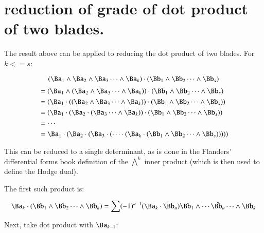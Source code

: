 \section{reduction of grade of dot product of two blades. }

The result above can be applied to reducing the dot product of two blades.  For $k<=s$:

\[
(\Ba_1 \wedge \Ba_2 \wedge \Ba_3 \cdots \wedge \Ba_k) \cdot (\Bb_1 \wedge \Bb_2 \cdots \wedge \Bb_s)
\]
\begin{align*}
&= (\Ba_1 \wedge (\Ba_2 \wedge \Ba_3 \cdots \wedge \Ba_k)) \cdot (\Bb_1 \wedge \Bb_2 \cdots \wedge \Bb_s) \\
&= (\Ba_1 \cdot ((\Ba_2 \wedge \Ba_3 \cdots \wedge \Ba_k)) \cdot (\Bb_1 \wedge \Bb_2 \cdots \wedge \Bb_s)) \\
&= (\Ba_1 \cdot (\Ba_2 \cdot (\Ba_3 \cdots \wedge \Ba_k)) \cdot (\Bb_1 \wedge \Bb_2 \cdots \wedge \Bb_s)) \\
&= \cdots \\
&= \Ba_1 \cdot (\Ba_2 \cdot (\Ba_3 \cdot (\cdots \cdot (\Ba_k \cdot (\Bb_1 \wedge \Bb_2 \cdots \wedge \Bb_s))))) \\
\end{align*}

This can be reduced to a single determinant, as is done in
the Flanders' differential forms book definition of the 
${\bigwedge}^k$ inner product (which is then used to define the Hodge dual).

The first such product is:

\[
\Ba_k \cdot (\Bb_1 \wedge \Bb_2 \cdots \wedge \Bb_k)
= \sum (-1)^{u-1} (\Ba_k \cdot \Bb_u) \Bb_1 \wedge \cdots \check{\Bb_u} \cdots \wedge \Bb_k
\]

Next, take dot product with $\Ba_{k-1}$:

